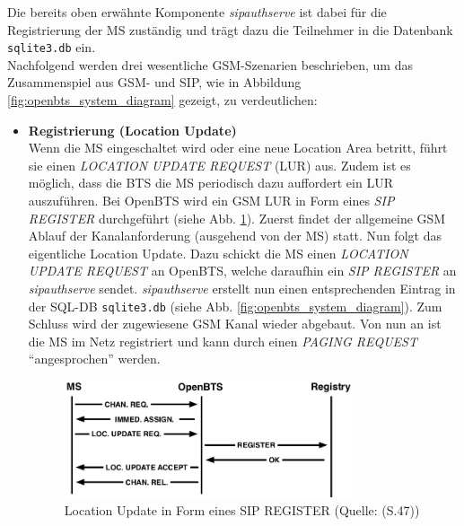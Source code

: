 Die bereits oben erwähnte Komponente \textit{sipauthserve} ist dabei für die Registrierung der MS zuständig und trägt dazu  die Teilnehmer in die Datenbank \verb|sqlite3.db| ein.\\ 
Nachfolgend werden drei wesentliche GSM-Szenarien beschrieben, um das Zusammenspiel aus GSM- und SIP, wie in Abbildung \ref{fig:openbts_system_diagram} gezeigt, zu verdeutlichen:
\begin{itemize}
\item \textbf{Registrierung (Location Update)}\\
Wenn die MS eingeschaltet wird oder eine neue Location Area betritt, führt sie einen \textit{LOCATION UPDATE REQUEST} (LUR) aus. Zudem ist es möglich, dass die BTS die MS periodisch dazu auffordert ein LUR auszuführen. Bei OpenBTS wird ein GSM LUR in Form eines \textit{SIP REGISTER} durchgeführt (siehe Abb. \ref{fig:openbts_registration}). Zuerst findet der allgemeine GSM Ablauf der Kanalanforderung (ausgehend von der MS) statt. Nun folgt das eigentliche Location Update. Dazu schickt die MS einen \textit{LOCATION UPDATE REQUEST} an OpenBTS, welche daraufhin ein \textit{SIP REGISTER} an \textit{sipauthserve} sendet. \textit{sipauthserve} erstellt nun einen entsprechenden Eintrag in der SQL-DB \verb|sqlite3.db| (siehe Abb. \ref{fig:openbts_system_diagram}). Zum Schluss wird der zugewiesene GSM Kanal wieder abgebaut. Von nun an ist die MS im Netz registriert und kann durch einen \textit{PAGING REQUEST} "`angesprochen"' werden.
\begin{figure}[h]
	\centering
		\includegraphics[width=0.80\textwidth]{img/openbts_registration.png}
	\caption{Location Update in Form eines SIP REGISTER (Quelle: \cite{bib:openbtsmanual}(S.47))}
	\label{fig:openbts_registration}
\end{figure}
\end{itemize}
